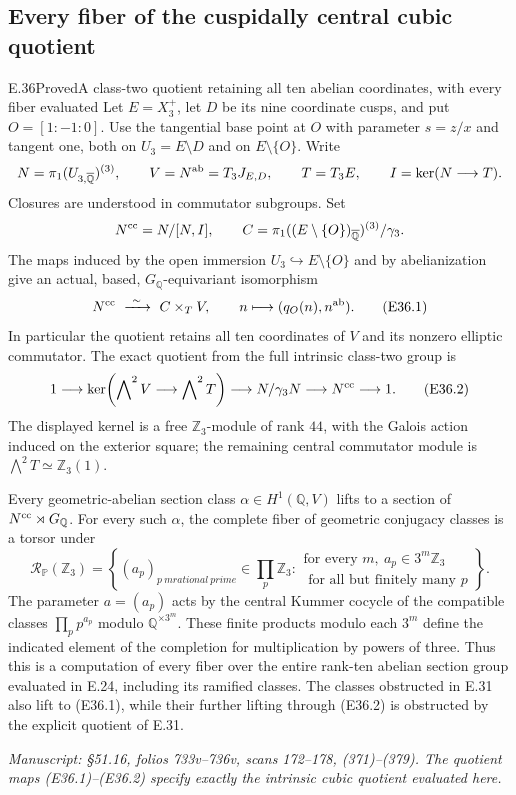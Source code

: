\subsection{Every fiber of the cuspidally central cubic quotient}

\begin{statement}{E.36}{Proved}{A class-two quotient retaining all ten abelian coordinates, with every fiber evaluated}
Let $E=X_3^+$, let $D$ be its nine coordinate cusps, and put
$O=[1:-1:0]$. Use the tangential base point at $O$ with
parameter $s=z/x$ and tangent one, both on $U_3=E\setminus D$
and on $E\setminus\{O\}$.
Write
\[
 N=\pi_1(U_{3,\overline{\mathbb Q}})^{(3)},\qquad
 V=N^{\rm ab}=T_3J_{E,D},\qquad T=T_3E,
 \qquad I=\ker(N\longrightarrow T).
\]
Closures are understood in commutator subgroups. Set
\[
 N^{\rm cc}=N/[N,I],\qquad
 C=\pi_1((E\setminus\{O\})_{\overline{\mathbb Q}})^{(3)}
                   /\gamma_3 .
\]
The maps induced by the open immersion
$U_3\hookrightarrow E\setminus\{O\}$ and by abelianization
give an actual, based, $G_{\mathbb Q}$-equivariant isomorphism
\[
 N^{\rm cc}\ \xrightarrow{\ \sim\ }\ C\times_T V,
       \qquad n\longmapsto(q_O(n),n^{\rm ab}).
 \tag{E36.1}
\]
In particular the quotient retains all ten coordinates of
$V$ and its nonzero elliptic commutator. The exact quotient
from the full intrinsic class-two group is
\[
 1\longrightarrow
 \ker\!\left(\bigwedge\nolimits^2 V
           \longrightarrow\bigwedge\nolimits^2 T\right)
 \longrightarrow N/\gamma_3N
 \longrightarrow N^{\rm cc}\longrightarrow1 .
 \tag{E36.2}
\]
The displayed kernel is a free $\mathbb Z_3$-module of rank
$44$, with the Galois action induced on the exterior square;
the remaining central commutator module is
$\bigwedge^2T\simeq\mathbb Z_3(1)$.

Every geometric-abelian section class
$\alpha\in H^1(\mathbb Q,V)$ lifts to a section of
$N^{\rm cc}\rtimes G_{\mathbb Q}$.
For every such $\alpha$, the complete fiber of geometric
conjugacy classes is a torsor under
\[
 \mathcal R_{\mathbb P}(\mathbb Z_3)
 =\left\{(a_p)_{p\ {
m rational\ prime}}\in
                \prod_p\mathbb Z_3:
       \substack{\text{for every }m,\ a_p\in3^m\mathbb Z_3\\
                         \text{ for all but finitely many }p}\right\}.
 \tag{E36.3}
\]
The parameter $a=(a_p)$ acts by the central Kummer cocycle
of the compatible classes $\prod_p p^{a_p}$ modulo
$\mathbb Q^{\times3^m}$. These finite products modulo each
$3^m$ define the indicated element of the completion for
multiplication by powers of three.
Thus this is a computation of every fiber over the entire
rank-ten abelian section group evaluated in E.24, including
its ramified classes. The classes obstructed in E.31 also
lift to (E36.1), while their further lifting through (E36.2)
is obstructed by the explicit quotient of E.31.

\emph{Manuscript: \S51.16, folios 733v--736v, scans 172--178,
(371)--(379). The quotient maps (E36.1)--(E36.2) specify
exactly the intrinsic cubic quotient evaluated here.}
\end{statement}
